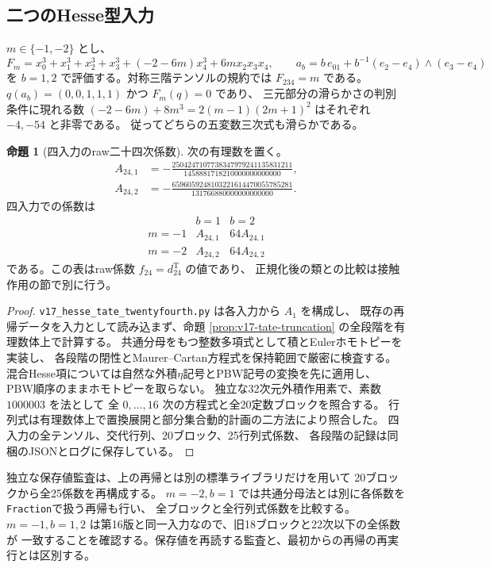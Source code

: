 \documentclass[a4paper,11pt]{ltjsarticle}
\theoremstyle{definition}
\newtheorem{proposition}[theorem]{命題}
\begin{document}
\subsection{二つのHesse型入力}
$m\in\{-1,-2\}$ とし、
\[
 F_m=x_0^3+x_1^3+x_2^3+x_3^3+(-2-6m)x_4^3+6m x_2x_3x_4,
 \qquad
 a_b=b\,e_{01}+b^{-1}(e_2-e_4)\wedge(e_3-e_4)
\]
を $b=1,2$ で評価する。対称三階テンソルの規約では $F_{234}=m$ である。
$q(a_b)=(0,0,1,1,1)$ かつ $F_m(q)=0$ であり、
三元部分の滑らかさの判別条件に現れる数
$(-2-6m)+8m^3=2(m-1)(2m+1)^2$ はそれぞれ $-4,-54$ と非零である。
従ってどちらの五変数三次式も滑らかである。

\begin{proposition}[四入力のraw二十四次係数]\label{prop:v17-tate24-values}
次の有理数を置く。
\begin{align*}
 A_{24,1}&=-\frac{2504247107738347979241135831211}
                      {1458881718210000000000000},\\
 A_{24,2}&=-\frac{6596059248103221614470055785281}
                      {131766880000000000000}.
\end{align*}
四入力での係数は
\[
 \begin{array}{c|cc}
       &b=1&b=2\\\hline
  m=-1&A_{24,1}&64A_{24,1}\\
  m=-2&A_{24,2}&64A_{24,2}
 \end{array}
\]
である。この表はraw係数 $f_{24}=d^{\mathrm T}_{24}$ の値であり、
正規化後の類との比較は接触作用の節で別に行う。
\end{proposition}
\begin{proof}
\texttt{v17\_hesse\_tate\_twentyfourth.py} は各入力から $A_1$ を構成し、
既存の再帰データを入力として読み込まず、命題
\ref{prop:v17-tate-truncation} の全段階を有理数体上で計算する。
共通分母をもつ整数多項式として積とEulerホモトピーを実装し、
各段階の閉性とMaurer--Cartan方程式を保持範囲で厳密に検査する。
混合Hesse項については自然な外積$\eta$記号とPBW記号の変換を先に適用し、
PBW順序のままホモトピーを取らない。
独立な32次元外積作用素で、素数 $1000003$ を法として
全 $0,\ldots,16$ 次の方程式と全20定数ブロックを照合する。
行列式は有理数体上で置換展開と部分集合動的計画の二方法により照合した。
四入力の全テンソル、交代行列、20ブロック、25行列式係数、
各段階の記録は同梱のJSONとログに保存している。
\end{proof}

独立な保存値監査は、上の再帰とは別の標準ライブラリだけを用いて
20ブロックから全25係数を再構成する。
$m=-2,b=1$ では共通分母法とは別に各係数を\texttt{Fraction}で扱う再帰も行い、
全ブロックと全行列式係数を比較する。
$m=-1,b=1,2$ は第16版と同一入力なので、旧18ブロックと22次以下の全係数が
一致することを確認する。保存値を再読する監査と、最初からの再帰の再実行とは区別する。
\end{document}
